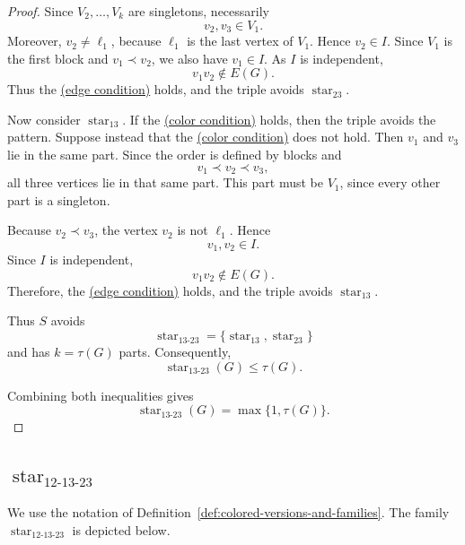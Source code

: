 \documentclass[12pt]{article}
\theoremstyle{plain}
\theoremstyle{definition}
\theoremstyle{remark}
\theoremstyle{definition}
\newcommand{\edgecondition}{%
  \hyperref[def:avoid:cond:edge]{(edge condition)}\xspace
}
\newcommand{\colorcondition}{%
  \hyperref[def:avoid:cond:color]{(color condition)}\xspace
}
\newcommand{\starlabel}{\mathrm{star}}
\DeclareRobustCommand{\starparam}[1]{%
  \ensuremath{\mathop{\starlabel}\nolimits_{#1}}%
}
\begin{document}
\begin{proof}
Since \(V_2,\dots,V_k\) are singletons, necessarily
\[
v_2,v_3\in V_1.
\]
Moreover, \(v_2\neq\ell_1\), because \(\ell_1\) is the last vertex of
\(V_1\). Hence \(v_2\in I\). Since \(V_1\) is the first block and
\(v_1\prec v_2\), we also have \(v_1\in I\). As \(I\) is independent,
\[
v_1v_2\notin E(G).
\]
Thus the \edgecondition{} holds, and the triple avoids
\(\starparam{23}\).

Now consider \(\starparam{13}\). If the \colorcondition{} holds, then
the triple avoids the pattern. Suppose instead that the
\colorcondition{} does not hold. Then \(v_1\) and \(v_3\) lie in the
same part. Since the order is defined by blocks and
\[
v_1\prec v_2\prec v_3,
\]
all three vertices lie in that same part. This part must be \(V_1\),
since every other part is a singleton.

Because \(v_2\prec v_3\), the vertex \(v_2\) is not \(\ell_1\). Hence
\[
v_1,v_2\in I.
\]
Since \(I\) is independent,
\[
v_1v_2\notin E(G).
\]
Therefore, the \edgecondition{} holds, and the triple avoids
\(\starparam{13}\).

Thus \(S\) avoids
\[
\starparam{13\text{-}23}
=
\{\starparam{13},\starparam{23}\}
\]
and has \(k=\tau(G)\) parts. Consequently,
\[
\starparam{13\text{-}23}(G)
\le
\tau(G).
\]

Combining both inequalities gives
\[
\starparam{13\text{-}23}(G)
=
\max\{1,\tau(G)\}.
\]
\end{proof}






\subsection{
\texorpdfstring{\(\starparam{12\text{-}13\text{-}23}\)}
{star12-13-23}
}
\label{subsec:star12-13-23}

We use the notation of
Definition~\ref{def:colored-versions-and-families}.
The family \(\starparam{12\text{-}13\text{-}23}\) is depicted below.
\end{document}
